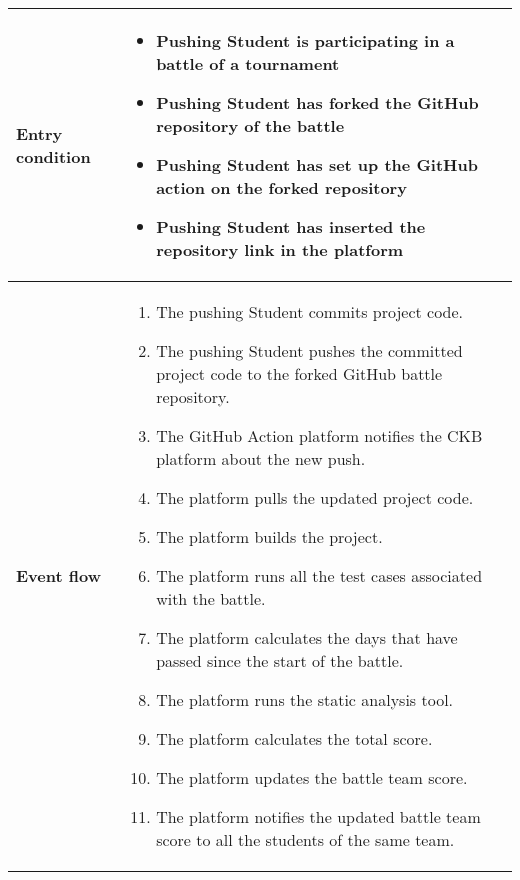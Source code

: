 \begin{enumerate}[label=\textbf{UC\arabic*}:,ref=UC\arabic*,leftmargin=1.3cm]
{\begin{table}[H]
\begin{tabular}{|l|p{11.9cm}|}
                        \textbf{Entry condition} &
                        \begin{itemize}
                              \item Pushing Student is participating in a battle of a tournament
                              \item Pushing Student has forked the GitHub repository of the battle
                              \item Pushing Student has set up the GitHub action on the forked repository
                              \item Pushing Student has inserted the repository link in the platform
                        \end{itemize}                                                                   \\\hline
                        \textbf{Event flow}      &
                        \begin{enumerate}[label=\arabic*.]
                              \item The pushing Student commits project code.
                              \item The pushing Student pushes the committed project code to the forked GitHub battle repository.
                              \item The GitHub Action platform notifies the CKB platform about the new push.
                              \item The platform pulls the updated project code.
                              \item The platform builds the project.
                              \item The platform runs all the test cases associated with the battle.
                              \item The platform calculates the days that have passed since the start of the battle.
                              \item The platform runs the static analysis tool.
                              \item The platform calculates the total score.
                              \item The platform updates the battle team score.
                              \item The platform notifies the updated battle team score to all the students of the same team.
                        \end{enumerate}                                           \\\hline

\end{tabular}
\end{table}}
\end{enumerate}
